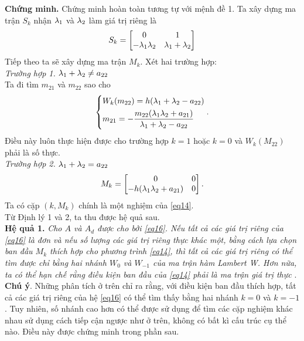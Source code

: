 \noindent\textbf{Chứng minh.} Chứng minh hoàn toàn tương tự với mệnh đề 1. Ta xây dựng ma trận $S_k$ nhận $\lambda_1$ và $\lambda_2$ làm giá trị riêng là
\begin{equation}\label{eq32}
	S_k =\begin{bmatrix}
		0 & 1\\ 
		- \lambda_1 \lambda_2 & \lambda_1 + \lambda_2
	\end{bmatrix}
\end{equation}
Tiếp theo ta sẽ xây dựng ma trận $M_k$. Xét hai trường hợp:\\
\noindent\textit{Trường hợp 1.} $\lambda_1 + \lambda_2 \ne a_{22}$\\
Ta đi tìm $m_{21}$ và $m_{22}$ sao cho
\begin{equation*}
	\left\{\begin{aligned}
		&W_k(m_{22}) = h  (\lambda_1 + \lambda_2 -a_{22})\\ 
		&m_{21} = - \dfrac{m_{22}(\lambda_1 \lambda_2+a_{21})}{\lambda_1  + \lambda_2 - a_{22}}
	\end{aligned}\right. . 
\end{equation*}
Điều này luôn thực hiện được cho trường hợp $k =1$ hoặc $k =0$ và $W_k(M_{22})$ phải là số thực. \\
\noindent\textit{Trường hợp 2.} $\lambda_1 + \lambda_2 = a_{22}$
\begin{equation*}
	M_k = \begin{bmatrix}
		0 & 0\\
		-h  (\lambda_1 \lambda_2 +a_{21}) & 0
	\end{bmatrix}.
\end{equation*}
Ta có cặp $(k, M_k)$ chính là một nghiệm của \eqref{eq14}.\\
Từ Định lý 1 và 2, ta thu được hệ quả sau.\\ 

\noindent\textbf{Hệ quả 1.} \textit{Cho $A$ và $A_d$ được cho bởi \eqref{eq16}. Nếu tất cả các giá trị riêng của \eqref{eq16} là đơn và  nếu số lượng các giá trị riêng thực khác một, bằng cách lựa chọn ban đầu $M_k$ thích hợp cho phương trình \eqref{eq14},  thì tất cả các giá trị riêng có thể tìm được chỉ bằng hai nhánh $W_0$ và $W_{-1}$ của ma trận hàm Lambert W. Hơn nữa, ta có thể hạn chế rằng điều kiện ban đầu của \eqref{eq14} phải là ma trận giá trị thực} .\\

\noindent\textbf{Chú ý}. Những phân tích ở trên chỉ ra rằng, với điều kiện ban đầu thích hợp, tất cả các giá trị riêng của hệ \eqref{eq16} có thể tìm thấy bằng hai nhánh $k =0$ và $k = -1$. Tuy nhiên, số nhánh cao hơn có thể được sử dụng để tìm các cặp nghiệm khác nhau sử dụng cách tiếp cận ngược như ở trên, không có bất kì cấu trúc cụ thể nào. Điều này được chứng minh trong phần sau.

